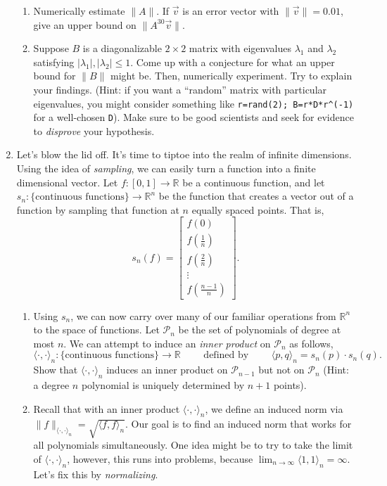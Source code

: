 \documentclass[letter]{article}
\newcommand{\R}{\mathbb{R}}
\newcommand{\mat}[1]{\begin{bmatrix}#1\end{bmatrix}}
\begin{document}
\begin{enumerate}
\begin{enumerate}
				\item Numerically estimate $\|A\|$. 
					If $\vec v$ is an error vector with $\|\vec v\|=0.01$, give an
					upper bound on $\|A^{30}\vec v\|$.
				\item Suppose $B$ is a diagonalizable $2\times 2$ matrix with eigenvalues
					$\lambda_1$ and $\lambda_2$ satisfying $|\lambda_1|,|\lambda_2|\leq 1$.
					Come up with a conjecture for what an upper bound for $\|B\|$ might be.
					Then, numerically experiment.  Try to explain your findings.  (Hint:
					if you want a ``random'' matrix with particular eigenvalues,
					you might consider something like {\tt r=rand(2); B=r*D*r\textasciicircum(-1)}
					for a well-chosen {\tt D}).  Make sure to be good scientists and
					seek for evidence to \emph{disprove} your hypothesis. 
			\end{enumerate}
		\item {\sc Let's blow the lid off}.  It's time to tiptoe into the realm of infinite
			dimensions.  Using the idea of \emph{sampling}, we can easily turn a function
					into a finite dimensional vector.  Let $f:[0,1]\to\R$ be a continuous
					function, and let $s_n:\{\text{continuous functions}\}\to\R^n$
					be the function that creates a vector out of a function by sampling
					that function at $n$ equally spaced points.  That is,
					\[
						s_n(f) = \mat{f(0)\\f(\frac{1}{n})\\f(\frac{2}{n})\\\vdots\\f(\frac{n-1}{n})}.
					\]
			\begin{enumerate}
				\item Using $s_n$, we can now carry over many of our familiar operations from $\R^n$ to 
					the space of functions.  Let $\mathcal P_n$ be the set of polynomials of degree at most $n$.
					We can attempt to induce an \emph{inner product} on $\mathcal P_n$ as follows,
					\[
						\langle\cdot,\cdot\rangle_n:\{\text{continuous functions}\}\to \R\qquad\text{ defined by }\qquad
						\langle p,q\rangle_n = s_n(p)\cdot s_n(q).
					\]
					Show that $\langle \cdot,\cdot\rangle_n$ induces an inner product on $\mathcal P_{n-1}$ but
					not on $\mathcal P_n$ (Hint: a degree $n$ polynomial is uniquely determined by $n+1$ points).
				\item Recall that with an inner product $\langle\cdot,\cdot\rangle_n$, we define an induced norm
					via $\|f\|_{\langle\cdot,\cdot\rangle_n}=\sqrt{\langle f, f\rangle_n}$.  Our goal
					is to find an induced norm that works for all polynomials simultaneously.  One idea might
					be to try to take the limit of $\langle\cdot,\cdot\rangle_n$, however, this runs into problems,
					because $\lim_{n\to\infty} \langle 1,1\rangle_n=\infty$.  Let's fix this by \emph{normalizing}.


\end{enumerate}
\end{enumerate}
\end{document}
